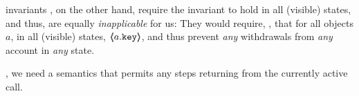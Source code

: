  invariants  \cite{Meyer92,MeyerDBC92,BarDelFahLeiSch04,objInvars,MuellerPoetzsch-HeffterLeavens06}, on the other hand, require the invariant to hold in all (visible) states, and thus,  are equally \emph{inapplicable} for us: They would require, \eg, that for all objects $a$, in all (visible) states, $\langle\!\!\langle a.\mbox{\normalfont{\texttt{key}}} \rangle\!\!\rangle$, and thus prevent \emph{any} withdrawals from \emph{any} account in \emph{any} state.

\vspace{.2cm}
, 
we need a semantics that permits any steps %
 returning from the currently active call.

%
%
% 

